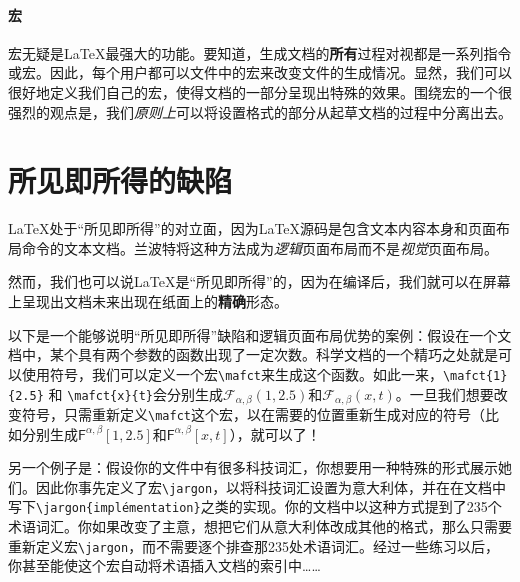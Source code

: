 \paragraph*{宏}宏无疑是\LaTeX 最强大的功能。要知道，生成文档的\textbf{所有}过程对视都是一系列指令或宏。因此，每个用户都可以文件中的宏来改变文件的生成情况。显然，我们可以很好地定义我们自己的宏，使得文档的一部分呈现出特殊的效果。围绕宏的一个很强烈的观点是，我们\textit{原则上}可以将设置格式的部分从起草文档的过程中分离出去。

\section*{所见即所得的缺陷}

\LaTeX 处于“所见即所得”的对立面，因为\LaTeX 源码是包含文本内容本身和页面布局命令的文本文档。兰波特将这种方法成为\textit{逻辑}页面布局而不是\textit{视觉}页面布局。

然而，我们也可以说\LaTeX 是“所见即所得”的，因为在编译后，我们就可以在屏幕上呈现出文档未来出现在纸面上的\textbf{精确}形态。

以下是一个能够说明“所见即所得”缺陷和逻辑页面布局优势的案例：假设在一个文档中，某个具有两个参数的函数出现了一定次数。科学文档的一个精巧之处就是可以使用符号，我们可以定义一个宏\texttt{\backslash mafct}来生成这个函数。如此一来，\texttt{\backslash mafct\{1\}\{2.5\}} 和 \texttt{\backslash mafct\{x\}\{t\}}会分别生成$\mathcal{F}_{\alpha, \beta}(1, 2.5)$和$\mathcal{F}_{\alpha, \beta}(x, t)$。一旦我们想要改变符号，只需重新定义\texttt{\backslash mafct}这个宏，以在需要的位置重新生成对应的符号（比如分别生成$\mathsf{F}^{\alpha, \beta}[1, 2.5]$和$\mathsf{F}^{\alpha, \beta}[x, t]$），就可以了！

另一个例子是：假设你的文件中有很多科技词汇，你想要用一种特殊的形式展示她们。因此你事先定义了宏\texttt{\backslash jargon}，以将科技词汇设置为意大利体，并在在文档中写下\texttt{\backslash jargon\{implémentation\}}之类的实现。你的文档中以这种方式提到了235个术语词汇。你如果改变了主意，想把它们从意大利体改成其他的格式，那么只需要重新定义宏\texttt{\backslash jargon}，而不需要逐个排查那235处术语词汇。经过一些练习以后，你甚至能使这个宏自动将术语插入文档的索引中……

